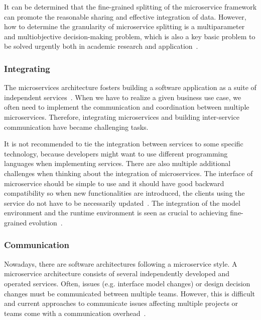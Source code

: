 It can be determined that the fine-grained splitting of the microservice framework can promote the reasonable sharing and effective integration of data. However, how to determine the granularity of microservice splitting is a multiparameter and multiobjective decision-making problem, which is also a key basic problem to be solved urgently both in academic research and application~\cite{Yan2020}.


\subsubsection{Integrating}%

The microservices architecture fosters building a software application as a suite of independent services~\cite{rosa2018}. When we have to realize a given business use case, we often need to implement the communication and coordination between multiple microservices. Therefore, integrating microservices and building inter-service communication have became challenging tasks. 

\par It is not recommended to tie the integration between services to some specific technology, because developers might want to use different programming languages when implementing services. 
There are also multiple additional challenges when thinking about the integration of microservices. The interface of microservice should be simple to use and it should have good backward compatibility so when new functionalities are introduced, the clients using the service do not have to be necessarily updated~\cite{liu2018, Zhang2019, Kalske2017}. The integration of the model environment and the runtime environment is seen as crucial to achieving fine-grained evolution~\cite{overeem2018}.




\subsubsection{Communication}%

Nowadays, there are software architectures following a microservice style. A microservice architecture consists of several independently developed and operated services. Often, issues (e.g. interface model changes) or design decision changes must be communicated between multiple teams. However, this is difficult and current approaches to communicate issues affecting multiple projects or teams come with a communication overhead~\cite{Speth2019}.

